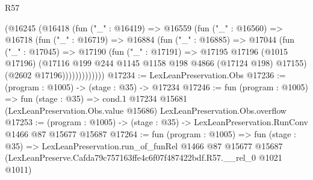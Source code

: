 \begin{lexlean}{R57}
\begin{coremodule}
            (@16245
              (@16418
                (fun ("_" : @16419) =>
                @16559
                  (fun ("_" : @16560) =>
                  @16718
                    (fun ("_" : @16719) =>
                    @16884
                      (fun ("_" : @16885) =>
                      @17044
                        (fun ("_" : @17045) =>
                        @17190
                          (fun ("_" : @17191) =>
                          @17195
                            @17196
                            (@1015 @17196)
                            (@17116 @199 @244 @1145 @1158 @198 @4866 (@17124 @198) @17155)
                            (@2602 @17196)))))))))))))
@17234 := LexLeanPreservation.Obs
@17236 := (program : @1005) -> (stage : @35) -> @17234
@17246 := fun (program : @1005) =>
  fun (stage : @35) =>
  cond.{1} @17234 @15681 (LexLeanPreservation.Obs.value @15686) LexLeanPreservation.Obs.overflow
@17253 := (program : @1005) -> (stage : @35) -> LexLeanPreservation.RunConv @1466 @87 @15677 @15687
@17264 := fun (program : @1005) =>
  fun (stage : @35) =>
  LexLeanPreservation.run_of_funRel
    @1466
    @87
    @15677
    @15687
    (LexLeanPreserve.Cafda79c757163ffe4c6f07f487422bdf.R57.__rel_0 @1021 @1011)
\end{coremodule}
\end{lexlean}
